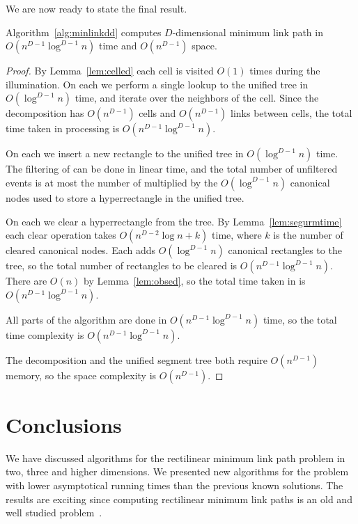 \documentclass[english,gradu]{tktltiki2018}
\begin{document}
We are now ready to state the final result.

\begin{theo}Algorithm~\ref{alg:minlinkdd} computes $D$-dimensional minimum link path in $O(n^{D-1}\log^{D-1}n)$ time and $O(n^{D-1})$ space.\end{theo}
\begin{proof}
By Lemma~\ref{lem:celled} each cell is visited $O(1)$ times during the illumination.
On each \cellE we perform a single lookup to the unified tree in $O(\log^{D-1} n)$ time, and iterate over the neighbors of the cell.
Since the decomposition has $O(n^{D-1})$ cells and $O(n^{D-1})$ links between cells, the total time taken in processing \cellEs is $O(n^{D-1}\log^{D-1} n)$.

On each \addE we insert a new rectangle to the unified tree in $O(\log^{D-1} n)$ time.
The filtering of \addEs can be done in linear time, and the total number of unfiltered events is at most the number of \addEs multiplied by the $O(\log^{D-1} n)$ canonical nodes used to store a hyperrectangle in the unified tree.

On each \obsE we clear a hyperrectangle from the tree.
By Lemma~\ref{lem:segurmtime} each clear operation takes $O(n^{D-2}\log n + k)$ time, where $k$ is the number of cleared canonical nodes.
Each \addE adds $O(\log^{D-1} n)$ canonical rectangles to the tree, so the total number of rectangles to be cleared is $O(n^{D-1}\log^{D-1} n)$.
There are $O(n)$ \obsEs by Lemma~\ref{lem:obsed}, so the total time taken in \obsEs is $O(n^{D-1}\log^{D-1} n)$.

All parts of the algorithm are done in $O(n^{D-1}\log^{D-1} n)$ time, so the total time complexity is $O(n^{D-1}\log^{D-1} n)$.

The decomposition and the unified segment tree both require $O(n^{D-1})$ memory, so the space complexity is $O(n^{D-1})$.
\end{proof}



\section{Conclusions}\label{sec:conclusions}

We have discussed algorithms for the rectilinear minimum link path problem in two, three and higher dimensions.
We presented new algorithms for the problem with lower asymptotical running times than the previous known solutions.
The results are exciting since computing rectilinear minimum link paths is an old and well studied problem~\cite{wagner,restricted}.
\end{document}
